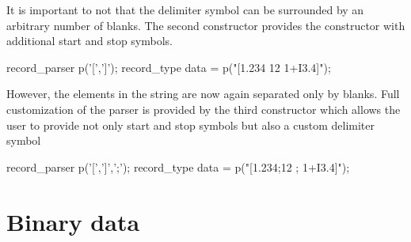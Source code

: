 It is important to not that the delimiter symbol can be surrounded by an
arbitrary number of blanks. 
The second constructor provides the constructor with additional 
start and stop symbols. 
\begin{cppcode}
record_parser p('[',']');
record_type data = p("[1.234 12  1+I3.4]");
\end{cppcode}
However, the elements in the string are now again separated only by blanks. 
Full customization of the parser is provided by the third constructor which
allows the user to provide not only start and stop symbols but also a custom 
delimiter symbol
\begin{cppcode}
record_parser p('[',']',';');
record_type data = p("[1.234;12 ; 1+I3.4]");
\end{cppcode}

\section{Binary data}


